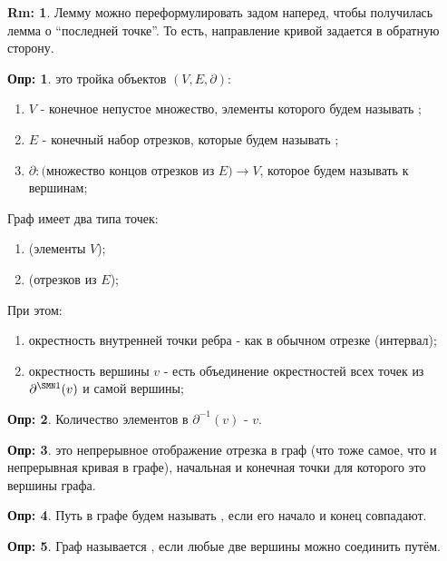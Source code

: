\documentclass[12pt]{article}
\theoremstyle{definition}
\newtheorem{defn}{Опр:}
\newtheorem{rem}{Rm:}
\begin{document}
\begin{rem}
	Лемму можно переформулировать задом наперед, чтобы получилась лемма о ``последней точке''. То есть, направление кривой задается в обратную сторону.
\end{rem}

\begin{defn}
	 это тройка объектов $(V,E,\partial)$:
	\begin{enumerate}[label ={(\arabic*)}]
		\item $V$ - конечное непустое множество, элементы которого будем называть ;
		\item $E$ - конечный набор отрезков, которые будем называть ;
		\item $\partial \colon \text{(множество концов отрезков из } E ) \to V$, которое будем называть  к вершинам;
	\end{enumerate}
	Граф имеет два типа точек: 
	\begin{enumerate}[label ={(\arabic*)}]
		\item {} (элементы $V$);
		\item {} (отрезков из $E$);
	\end{enumerate}
	При этом:
	\begin{enumerate}[label ={(\arabic*)}]
		\item окрестность внутренней точки ребра - как в обычном отрезке (интервал);
		\item окрестность вершины $v$ - есть объединение окрестностей всех точек из $\partial^{\SMN1}(v)$ и самой вершины; 
	\end{enumerate}
\end{defn}

\begin{defn}
	Количество элементов в $\partial^{-1}(v)$ -  $v$.
\end{defn}

\begin{defn}
	 это непрерывное отображение отрезка в граф (что тоже самое, что и непрерывная кривая в графе), начальная и конечная точки для которого это вершины графа.
\end{defn}

\begin{defn}
	Путь в графе будем называть , если его начало и конец совпадают.
\end{defn}

\begin{defn}
	Граф называется , если любые две вершины можно соединить путём.
\end{defn}
\end{document}
